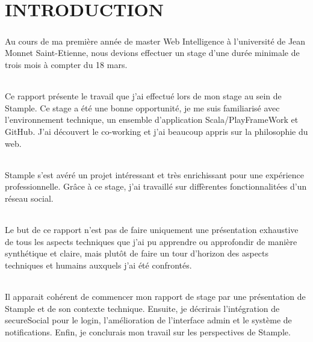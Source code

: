 \chapter{INTRODUCTION}
\paragraph{}
Au cours de ma première année de master Web Intelligence à l'université de Jean Monnet Saint-Etienne, nous devions effectuer un stage d'une durée minimale de trois mois à compter du 18 mars.
\subparagraph{}
Ce rapport présente le travail que j'ai effectué lors de mon stage au sein de Stample.
\newline
Ce stage a été une bonne opportunité, je me suis familiarisé avec l'environnement technique, un ensemble d'application Scala/PlayFrameWork et GitHub.
J'ai découvert le co-working et j'ai beaucoup appris sur la philosophie du web.
\subparagraph{}
Stample s'est avéré un projet intéressant et très enrichissant pour une expérience professionnelle. Gr\^ace à ce stage, j'ai travaillé sur diffèrentes fonctionnalitées d'un réseau social.
\subparagraph{}
Le but de ce rapport n’est pas de faire uniquement une présentation exhaustive de tous les aspects techniques que j’ai pu apprendre ou approfondir de manière synthétique et claire, mais plutôt de faire un tour d’horizon des aspects techniques et humains auxquels j’ai été confrontés.
\subparagraph{}
Il apparait cohérent de commencer mon rapport de stage par une présentation de Stample et de son contexte technique. Ensuite, je décrirais l'intégration de secureSocial pour le login, l'amélioration de l'interface admin  et le système de notifications. Enfin, je conclurais  mon travail sur les perspectives de Stample.